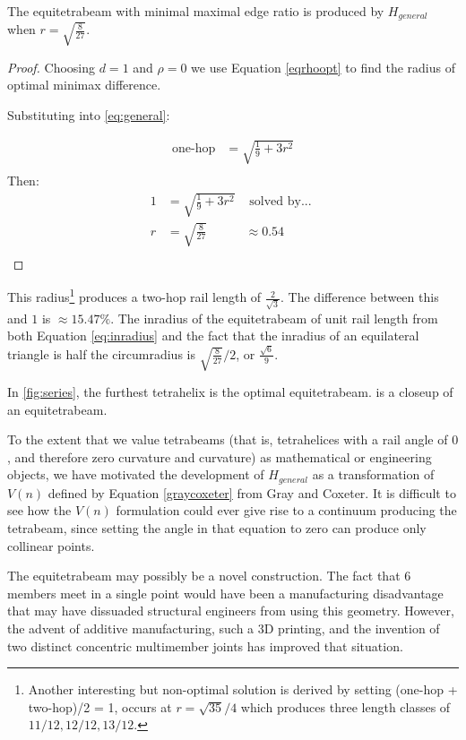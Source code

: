 \documentclass[review]{siamonline1116}
\begin{document}
\begin{corollary}
  The equitetrabeam with minimal maximal edge ratio is produced
  \newline by $H_{general}$ when $ r = \sqrt{\frac{8}{27}} $.
\end{corollary}

\begin{proof}
Choosing $d = 1$ and $\rho = 0$ we use Equation \eqref{eqrhoopt} to find the radius of 
optimal minimax difference.

Substituting into \eqref{eq:general}:

\begin{align*}
  \text{one-hop} &= \sqrt{\frac{1}{9} + 3r^2}\\
\end{align*}
Then:
\begin{align*}
   1  &=  \sqrt{\frac{1}{9} + 3r^2} & \text{ solved by... }\\
   r  &= \sqrt{\frac{8}{27}} &\approx 0.54 \\
\end{align*}
\end{proof}

This radius\footnote{Another interesting but non-optimal solution is derived by setting
  (one-hop + two-hop)/2 = 1,
  occurs at $r = \sqrt{35}/4$ which produces
  three length classes of $11/12, 12/12, 13/12$.}
produces a two-hop rail length of $\frac{2}{\sqrt{3}}$.
The difference between this and $1$ is $\approx 15.47\% $. The inradius of the equitetrabeam of unit
rail length from both Equation \eqref{eq:inradius} and the fact that the inradius of
an equilateral triangle is half the circumradius is $\sqrt{\frac{8}{27}}/2$, or $\frac{\sqrt{6}}{9}$.


In \cref{fig:series}, the furthest tetrahelix is the optimal equitetrabeam.
 is a closeup of an equitetrabeam.

To the extent that we value tetrabeams (that is, tetrahelices with a rail angle of $0$,
and therefore zero curvature and curvature) as mathematical or engineering objects,
we have motivated the development of $H_{general}$ as a transformation of $V(n)$ defined by
Equation \eqref{graycoxeter} from Gray and Coxeter. It is difficult to see how
the $V(n)$ 
formulation could ever give rise to a continuum producing the tetrabeam,
since setting the angle in that equation to zero can produce only collinear points.

The equitetrabeam may possibly be a novel construction.
The fact that 6 members meet in a single point would have been a manufacturing disadvantage that
may have dissuaded structural engineers from using this geometry.
However, the advent of additive manufacturing, such a 3D printing, and the invention of two
distinct concentric multimember joints\cite{song2003spherical,HamlinSandersonCMS} has improved that situation.
\end{document}
